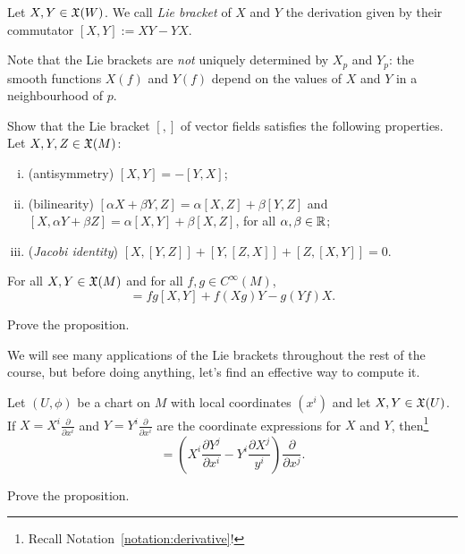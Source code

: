 \begin{definition}
    Let $X,Y\in\mathfrak{X}(W)$. We call \emph{Lie bracket} of $X$ and $Y$ the derivation given by their commutator $[X,Y] := X Y - Y X$.
\end{definition}

\begin{remark}
  Note that the Lie brackets are \emph{not} uniquely determined by $X_p$ and $Y_p$: the smooth functions $X(f)$ and $Y(f)$ depend on the values of $X$ and $Y$ in a neighbourhood of $p$.
\end{remark}

\begin{exercise}\label{ex:vfliealgebra}
  Show that the Lie bracket $[,]$ of vector fields satisfies the following properties. Let $X,Y,Z\in\mathfrak{X}(M)$:
  \begin{enumerate}[(i)]
    \item (antisymmetry) $[X, Y] = - [Y, X]$;
    \item (bilinearity) $[\alpha X + \beta Y, Z] = \alpha [X, Z] + \beta [Y, Z]$ and $[X, \alpha Y + \beta Z] = \alpha [X, Y] + \beta [X, Z]$, for all $\alpha,\beta \in\mathbb{R}$;
    \item (\emph{Jacobi identity}) $[X,[Y,Z]] + [Y,[Z,X]] + [Z,[X,Y]] = 0$.
  \end{enumerate}
\end{exercise}

\begin{proposition}
  For all $X, Y \in \mathfrak{X}(M)$ and for all $f,g\in C^\infty(M)$,
  \begin{equation}
    [fX, gY] = fg[X,Y] + f(Xg)Y - g(Yf)X.
  \end{equation}
\end{proposition}
\begin{exercise}
  Prove the proposition.
\end{exercise}

We will see many applications of the Lie brackets throughout the rest of the course, but before doing anything, let's find an effective way to compute it.

\begin{proposition}
    Let $(U, \phi)$ be a chart on $M$ with local coordinates $(x^i)$ and let $X,Y\in\mathfrak{X}(U)$.
    If $X = X^i \frac{\partial }{\partial x^i}$ and $Y = Y^i \frac{\partial}{\partial x^i}$ are the coordinate expressions for $X$ and $Y$, then\footnote{Recall Notation~\ref{notation:derivative}!}
    \begin{equation}
        [X,Y] = \left(X^i\frac{\partial Y^j}{\partial x^i} - Y^i\frac{\partial X^j}{y^i}\right)\frac{\partial}{\partial x^j}.
    \end{equation}
\end{proposition}
\begin{exercise}
  Prove the proposition.
\end{exercise}

